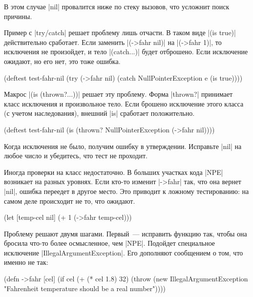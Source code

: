 В этом случае \spverb|nil| провалится ниже по стеку вызовов, что усложнит поиск
причины.

Пример с \spverb|try/catch| решает проблему лишь отчасти. В таком виде
\spverb|(is true)| действительно сработает. Если заменить \spverb|(->fahr nil)|
на \spverb|(->fahr 1)|, то исключения не произойдет, и тело \spverb|(catch...)|
будет отброшено. Если исключение ожидают, но его нет, это тоже ошибка.

\begin{english}
  \begin{clojure}
(deftest test-fahr-nil
  (try
    (->fahr nil)
    (catch NullPointerException e
      (is true))))
  \end{clojure}
\end{english}

Макрос \spverb|(is (thrown?...))| решает эту проблему. Форма \spverb|thrown?|
принимает класс исключения и произвольное тело. Если брошено исключение этого
класса (с учетом наследования), внешний \spverb|is| сработает
положительно.

\begin{english}
  \begin{clojure}
(deftest test-fahr-nil
  (is (thrown? NullPointerException
               (->fahr nil))))
  \end{clojure}
\end{english}

Когда исключения не было, получим ошибку в утверждении. Исправьте \spverb|nil|
на любое число и убедитесь, что тест не проходит.

Иногда проверки на класс недостаточно. В больших участках кода \spverb|NPE|
возникает на разных уровнях. Если кто-то изменит \spverb|->fahr| так, что она
вернет \spverb|nil|, ошибка переедет в другое место. Это приводит к ложному
тестированию: на самом деле происходит не то, что ожидают.

\begin{english}
  \begin{clojure}
(let [temp-cel nil]
  (+ 1 (->fahr temp-cel)))
  \end{clojure}
\end{english}

Проблему решают двумя шагами. Первый~--- исправить функцию так, чтобы она
бросила что-то более осмысленное, чем \spverb|NPE|. Подойдет специальное
исключение \spverb|IllegalArgumentException|. Его дополняют сообщением о том,
что именно не так:

\begin{english}
  \begin{clojure}
(defn ->fahr [cel]
  (if cel
    (+ (* cel 1.8) 32)
    (throw (new IllegalArgumentException
            "Fahrenheit temperature should be a real number"))))
  \end{clojure}
\end{english}

